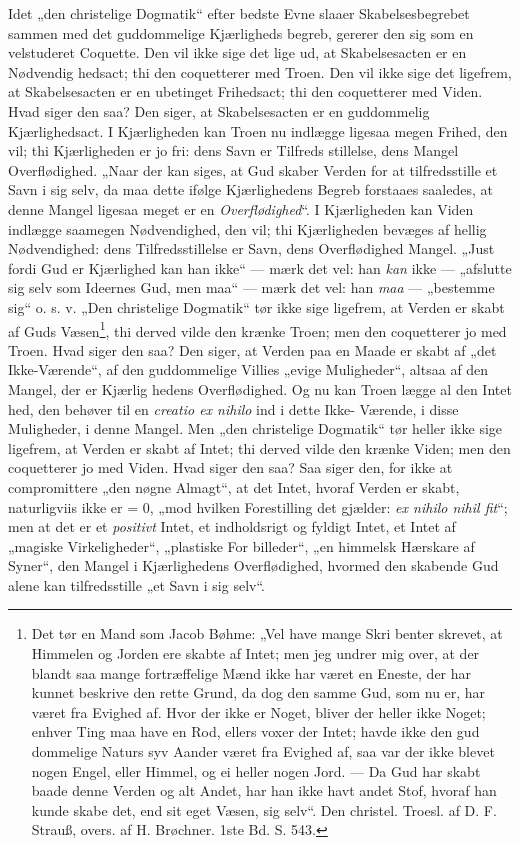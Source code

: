 \documentclass[12pt]{book}
\newcommand{\opage}[1]{\marginnote{\footnotesize\textit{[#1]}}}
\begin{document}
Idet „den christelige Dogmatik“ efter bedste Evne slaaer
Skabelsesbegrebet sammen med det guddommelige Kjærligheds\-%
begreb, gererer den sig som en velstuderet Coquette. Den
vil ikke sige det lige ud, at Skabelsesacten er en Nødvendig\-%
hedsact; thi den coquetterer med Troen. Den vil ikke sige det
ligefrem, at Skabelsesacten er en ubetinget Frihedsact; thi
den coquetterer med Viden. Hvad siger den saa? Den siger,
at Skabelsesacten er en guddommelig Kjærlighedsact. I
Kjærligheden kan Troen nu indlægge ligesaa megen Frihed,
den vil; thi Kjærligheden er jo fri: dens Savn er Tilfreds\-%
stillelse, dens Mangel Overflødighed. „Naar der kan siges,
at Gud skaber Verden for at tilfredsstille et Savn i sig selv,
da maa dette ifølge Kjærlighedens Begreb forstaaes saaledes,
at denne Mangel ligesaa meget er en \emph{Overflødighed}“. I
Kjærligheden kan Viden indlægge saamegen Nødvendighed,
den vil; thi Kjærligheden bevæges af hellig Nødvendighed:
dens Tilfredsstillelse er Savn, dens Overflødighed Mangel.
„Just fordi Gud er Kjærlighed kan han ikke“ --- mærk det
vel: han \emph{kan} ikke --- „afslutte sig selv som Ideernes Gud,
men maa“ --- mærk det vel: han \emph{maa} --- „bestemme sig“
o. s. v. „Den christelige Dogmatik“ tør ikke sige ligefrem, at
Verden er skabt af Guds Væsen\footnote{Det tør en Mand som Jacob Bøhme: „Vel have mange Skri\-%
benter skrevet, at Himmelen og Jorden ere skabte af Intet; men
jeg undrer mig over, at der blandt saa mange fortræffelige Mænd
ikke har været en Eneste, der har kunnet beskrive den rette Grund,
da dog den samme Gud, som nu er, har været fra Evighed af.
Hvor der ikke er Noget, bliver der heller ikke Noget; enhver Ting
maa have en Rod, ellers voxer der Intet; havde ikke den gud\-%
dommelige Naturs syv Aander været fra Evighed af, saa var der
ikke blevet nogen Engel, eller Himmel, og ei heller nogen Jord. ---
Da Gud har skabt baade denne Verden og alt Andet, har han
ikke havt andet Stof, hvoraf han kunde skabe det, end sit eget
Væsen, sig selv“. Den christel. Troesl. af D. F. Strauß, overs.
af H. Brøchner. 1ste Bd. S. 543.}, thi derved vilde den
\opage{99}\setcounter{footnote}{0}%
krænke Troen; men den coquetterer jo med Troen. Hvad
siger den saa? Den siger, at Verden paa en Maade er
skabt af „det Ikke-Værende“, af den guddommelige Villies
„evige Muligheder“, altsaa af den Mangel, der er Kjærlig\-%
hedens Overflødighed. Og nu kan Troen lægge al den Intet\-%
hed, den behøver til en \textit{creatio ex nihilo} ind i dette Ikke-%
Værende, i disse Muligheder, i denne Mangel. Men „den
christelige Dogmatik“ tør heller ikke sige ligefrem, at Verden
er skabt af Intet; thi derved vilde den krænke Viden; men
den coquetterer jo med Viden. Hvad siger den saa? Saa
siger den, for ikke at compromittere „den nøgne Almagt“, at
det Intet, hvoraf Verden er skabt, naturligviis ikke er = 0,
„mod hvilken Forestilling det gjælder: \textit{ex nihilo nihil fit}“;
men at det er et \emph{positivt} Intet, et indholdsrigt og fyldigt
Intet, et Intet af „magiske Virkeligheder“, „plastiske For\-%
billeder“, „en himmelsk Hærskare af Syner“, den Mangel i
Kjærlighedens Overflødighed, hvormed den skabende Gud alene
kan tilfredsstille „et Savn i sig selv“.
\end{document}
